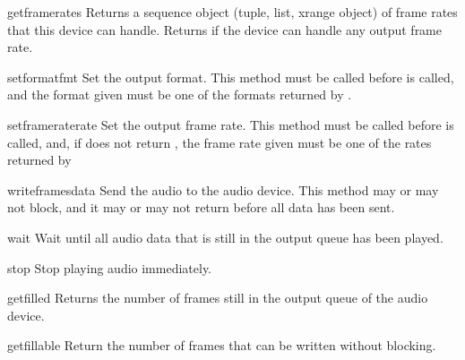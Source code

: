 \begin{methoddesc}{getframerates}{}
Returns a sequence object (tuple, list, xrange object) of frame rates
that this device can handle.  Returns  if the device can
handle any output frame rate.
\end{methoddesc}

\begin{methoddesc}{setformat}{fmt}
Set the output format.  This method must be called before
 is called, and the format given must be one of the
formats returned by .
\end{methoddesc}

\begin{methoddesc}{setframerate}{rate}
Set the output frame rate.  This method must be called before
 is called, and, if  does not return
, the frame rate given must be one of the rates returned by
\end{methoddesc}

\begin{methoddesc}{writeframes}{data}
Send the audio  to the audio device.  This method may or may
not block, and it may or may not return before all data has been sent.
\end{methoddesc}

\begin{methoddesc}{wait}{}
Wait until all audio data that is still in the output queue has been
played.
\end{methoddesc}

\begin{methoddesc}{stop}{}
Stop playing audio immediately.
\end{methoddesc}

\begin{methoddesc}{getfilled}{}
Returns the number of frames still in the output queue of the audio
device.
\end{methoddesc}

\begin{methoddesc}{getfillable}{}
Return the number of frames that can be written without
 blocking.
\end{methoddesc}
